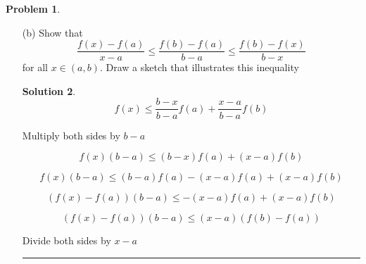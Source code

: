 \documentclass{article}
\theoremstyle{definition}
\newtheorem{problem}{Problem}
\def\fline{\rule{0.75\linewidth}{0.5pt}}
\newcommand{\finishline}{\begin{center}\fline\end{center}}
\newtheorem*{solution*}{Solution}
\newenvironment{solution}{\begin{solution*}}{{\finishline} \end{solution*}}
\begin{document}
\begin{problem}
\begin{enumerate}
\begin{solution}
                        $f(x) \leq \frac{b - x}{b - a} f(a) + \frac{x - a}{b - a} f(b)$ \newline 
                    \end{solution}
        \item[(b)] Show that 
                    \begin{equation}
                        \label{eq:example}
                            \frac{f(x) - f(a)}{x - a} \leq \frac{f(b) - f(a)}{b - a} \leq \frac{f(b) - f(x)}{b - x} 
                    \end{equation}
                    for all $x \in (a, b)$. Draw a sketch that illustrates this inequality

                    \begin{solution}
                        \begin{equation}
                        \label{eq:example}
                            f(x) \leq \frac{b - x}{b - a} f(a) + \frac{x - a}{b - a} f(b)
                    \end{equation}

                    Multiply both sides by $b - a$ \newline 

                    \begin{equation}
                        \label{eq:example}
                            f(x) (b - a) \leq (b - x) f(a) + (x - a) f(b)
                    \end{equation}

                    \begin{equation}
                        \label{eq:example}
                            f(x) (b - a) \leq (b - a) f(a) - (x - a) f(a) + (x - a) f(b)
                    \end{equation}

                    \begin{equation}
                        \label{eq:example}
                            (f(x) - f(a)) (b - a) \leq - (x - a) f(a) + (x - a) f(b)
                    \end{equation}

                    \begin{equation}
                        \label{eq:example}
                            (f(x) - f(a)) (b - a) \leq (x - a) (f(b) - f(a))
                    \end{equation}

                    Divide both sides by $x - a$


\end{solution}
\end{enumerate}
\end{problem}
\end{document}
